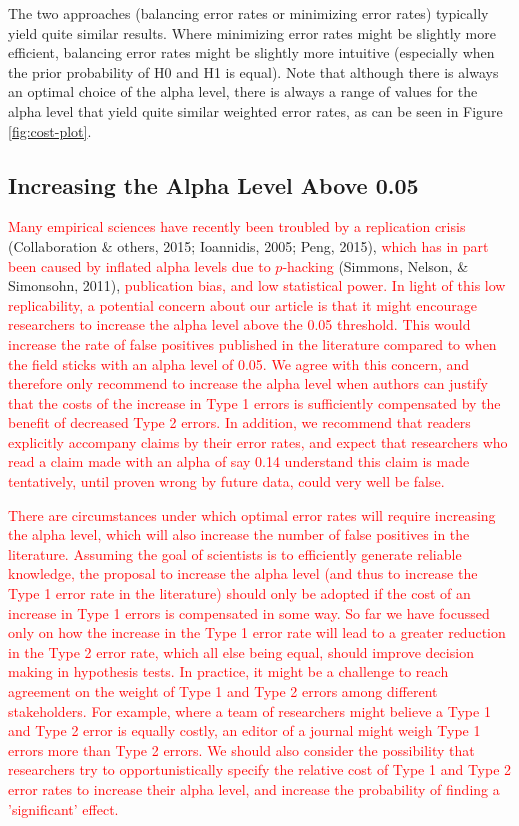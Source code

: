\documentclass[
  english,
  ,man, a4paper,floatsintext]{apa6}
\begin{document}
The two approaches (balancing error rates or minimizing error rates) typically yield quite similar results. Where minimizing error rates might be slightly more efficient, balancing error rates might be slightly more intuitive (especially when the prior probability of H0 and H1 is equal). Note that although there is always an optimal choice of the alpha level, there is always a range of values for the alpha level that yield quite similar weighted error rates, as can be seen in Figure \ref{fig:cost-plot}.

\hypertarget{increasing-the-alpha-level-above-0.05}{%
\subsection{Increasing the Alpha Level Above 0.05}\label{increasing-the-alpha-level-above-0.05}}

\textcolor{red}{Many empirical sciences have recently been troubled by a replication crisis}
(Collaboration \& others, 2015; Ioannidis, 2005; Peng, 2015),
\textcolor{red}{which has in part been caused by inflated alpha levels due to $p$-hacking} (Simmons, Nelson, \& Simonsohn, 2011),
\textcolor{red}{publication bias, and low statistical power. In light of this low replicability, a potential concern about our article is that it might encourage researchers to increase the alpha level above the 0.05 threshold. This would increase the rate of false positives published in the literature compared to when the field sticks with an alpha level of 0.05. We agree with this concern, and therefore only recommend to increase the alpha level when authors can justify that the costs of the increase in Type 1 errors is sufficiently compensated by the benefit of decreased Type 2 errors. In addition, we recommend that readers explicitly accompany claims by their error rates, and expect that researchers who read a claim made with an alpha of say 0.14 understand this claim is made tentatively, until proven wrong by future data, could very well be false.}

\textcolor{red}{There are circumstances under which optimal error rates will require increasing the alpha level, which will also increase the number of false positives in the literature. Assuming the goal of scientists is to efficiently generate reliable knowledge, the proposal to increase the alpha level (and thus to increase the Type 1 error rate in the literature) should only be adopted if the cost of an increase in Type 1 errors is compensated in some way. So far we have focussed only on how the increase in the Type 1 error rate will lead to a greater reduction in the Type 2 error rate, which all else being equal, should improve decision making in hypothesis tests. In practice, it might be a challenge to reach agreement on the weight of Type 1 and Type 2 errors among different stakeholders. For example, where a team of researchers might believe a Type 1 and Type 2 error is equally costly, an editor of a journal might weigh Type 1 errors more than Type 2 errors. We should also consider the possibility that researchers try to opportunistically specify the relative cost of Type 1 and Type 2 error rates to increase their alpha level, and increase the probability of finding a 'significant' effect.}
\end{document}
